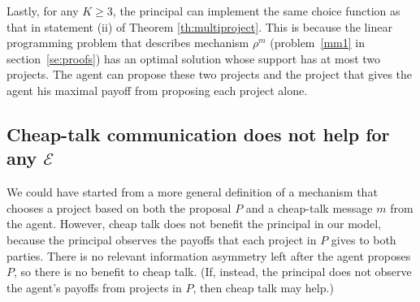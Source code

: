 \documentclass[12pt,english]{article}
\newcommand{\cale}{\mathcal E}
\newcommand{\eran}[1]{\begin{framed}{\noindent {\bf Eran:} #1}\end{framed}}
\theoremstyle{remark}
\theoremstyle{plain}
\theoremstyle{definition}
\begin{document}
Lastly, for any $K \geqslant 3$, the principal can implement the same choice function as that in statement (ii) of Theorem \ref{th:multiproject}. This is because the linear programming problem that describes mechanism $\rho^m$ (problem~\eqref{mm1} in section~\ref{se:proofs}) has an optimal solution whose support has at most two projects. The agent can propose these two projects and the project that gives the agent his maximal payoff from proposing each project alone.





\subsection{Cheap-talk communication does not help for any $\cale$}  \label{se:cheaptalk}

We could have started from a more general definition of a mechanism that chooses a project based on both the proposal $P$ and a cheap-talk message $m$ from the agent. However, cheap talk does not benefit the principal in our model, because the principal observes the payoffs that each project in $P$ gives to both parties. There is no relevant information asymmetry left after the agent proposes $P$, so there is no benefit to cheap talk. (If, instead, the principal does not observe the agent's payoffs from projects in $P$, then cheap talk may help.)
\end{document}
